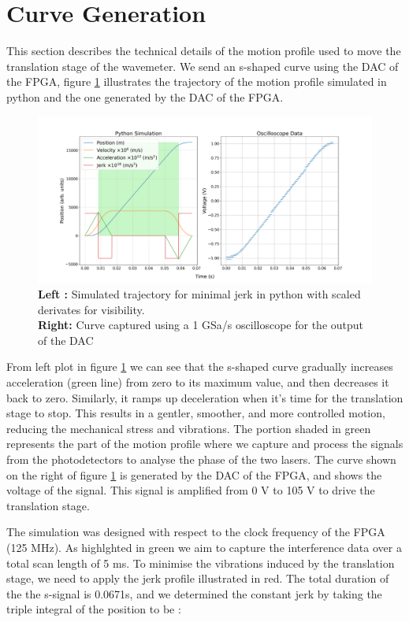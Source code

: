\documentclass[12pt, twoside]{report}
\begin{document}
\section{Curve Generation}\label{crv-gen}

This section describes the technical details of the motion profile used to move the translation stage of the wavemeter. We send an s-shaped curve using the DAC of the FPGA, figure \ref{fig:s-crv} illustrates the trajectory of the motion profile simulated in python and the one generated by the DAC of the FPGA.

\begin{figure}[H]
    \centering
    \includegraphics[width=\textwidth]{figs/s-crv.png}
    \caption{{\bf Left :} Simulated trajectory for minimal jerk in python with scaled derivates for visibility. \\ 
    {\bf Right:} Curve captured using a 1 GSa/s oscilloscope for the output of the DAC }
    \label{fig:s-crv}
\end{figure}

From left plot in figure \ref{fig:s-crv} we can see that the s-shaped curve gradually increases acceleration (green line) from zero to its maximum value, and then decreases it back to zero. Similarly, it ramps up deceleration when it's time for the translation stage to stop. This results in a gentler, smoother, and more controlled motion, reducing the mechanical stress and vibrations. The portion shaded in green represents the part of the motion profile where we capture and process the signals from the photodetectors to analyse the phase of the two lasers. The curve shown on the right of figure \ref{fig:s-crv} is generated by the DAC of the FPGA, and shows the voltage of the signal. This signal is amplified from 0 V to 105 V to drive the translation stage. 

\vspace{1em}
The simulation was designed with respect to the clock frequency of the FPGA (125 MHz). As highlghted in green we aim to capture the interference data over a total scan length of 5 ms. To minimise the vibrations induced by the translation stage, we need to apply the jerk profile illustrated in red. The total duration of the the s-signal is 0.0671s, and we determined the constant jerk by taking the triple integral of the position to be :
\end{document}
